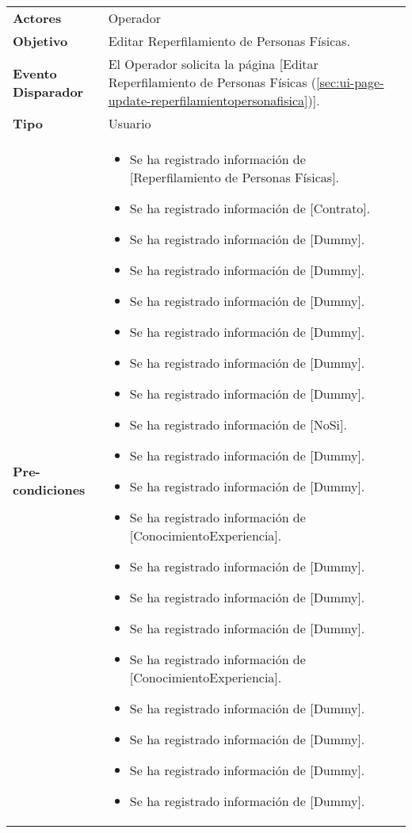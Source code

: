 	\begin{tabular}{ p{3.5cm} p{11.5cm} }
		\textbf{Actores} & Operador\\
		\textbf{Objetivo} & Editar Reperfilamiento de Personas F\'isicas.\\
		\textbf{Evento Disparador} & El Operador solicita la p\'agina [Editar Reperfilamiento de Personas F\'isicas (\ref{sec:ui-page-update-reperfilamientopersonafisica})].\\
		\textbf{Tipo} & Usuario\\
		\textbf{Pre-condiciones} &
			\begin{minipage}[t]{0.6\textwidth}
			\begin{itemize}[noitemsep,nolistsep]
			\setlength{\itemindent}{-.5cm}
				\item Se ha registrado informaci\'on de [Reperfilamiento de Personas F\'isicas].
				\item Se ha registrado informaci\'on de [Contrato].
				\item Se ha registrado informaci\'on de [Dummy].
				\item Se ha registrado informaci\'on de [Dummy].
				\item Se ha registrado informaci\'on de [Dummy].
				\item Se ha registrado informaci\'on de [Dummy].
				\item Se ha registrado informaci\'on de [Dummy].
				\item Se ha registrado informaci\'on de [Dummy].
				\item Se ha registrado informaci\'on de [NoSi].
				\item Se ha registrado informaci\'on de [Dummy].
				\item Se ha registrado informaci\'on de [Dummy].
				\item Se ha registrado informaci\'on de [ConocimientoExperiencia].
				\item Se ha registrado informaci\'on de [Dummy].
				\item Se ha registrado informaci\'on de [Dummy].
				\item Se ha registrado informaci\'on de [Dummy].
				\item Se ha registrado informaci\'on de [ConocimientoExperiencia].
				\item Se ha registrado informaci\'on de [Dummy].
				\item Se ha registrado informaci\'on de [Dummy].
				\item Se ha registrado informaci\'on de [Dummy].
				\item Se ha registrado informaci\'on de [Dummy].

\end{itemize}
\end{minipage}
\end{tabular}
